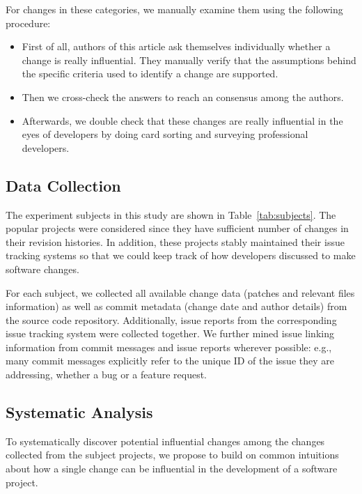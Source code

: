 For changes in these categories, we manually examine them using the following
procedure:
\begin{itemize}
	\item First of all, authors of this article ask themselves individually whether a change is really influential.
	They manually verify that the assumptions behind the specific criteria used to identify a change are supported.
	\item Then we cross-check the answers to reach an consensus among the authors.
\item Afterwards, we double check that these changes are really influential in
the eyes of developers by doing card sorting and surveying professional
developers.
\end{itemize}



\subsection{Data Collection}
The experiment subjects in this study are shown in 
Table~\ref{tab:subjects}. The \numSubjects popular
projects were considered since they have sufficient number of 
changes in their revision histories. In addition,
these projects stably maintained their issue tracking systems so that we
could keep track of how developers discussed to make software changes.


For each subject, we collected all available change data (patches and relevant
files information) as well as commit metadata (change date and author details) from
the source code repository.
Additionally, issue reports from the corresponding issue tracking system were
collected together. We further mined issue linking information from commit
messages and issue reports wherever possible: e.g., many commit messages
explicitly refer to the unique ID of the issue they are addressing, whether a
bug or a feature request.

\subsection{Systematic Analysis}
To systematically discover potential influential changes among the changes collected from
the subject projects, we propose to build on common intuitions about how a single change can
be influential in the development of a software project.


